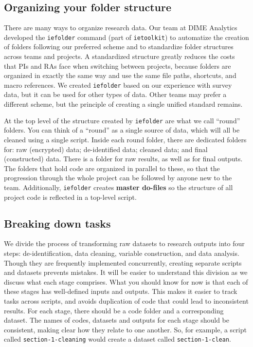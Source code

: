 \subsection{Organizing your folder structure}

There are many ways to organize research data.
Our team at DIME Analytics developed the \texttt{iefolder}
command (part of \texttt{ietoolkit})
to automatize the creation of folders following our preferred scheme and
to standardize folder structures across teams and projects.
A standardized structure greatly reduces the costs that PIs and RAs
face when switching between projects,
because folders are organized in exactly the same way
and use the same file paths, shortcuts, and macro references.
We created \texttt{iefolder} based on our experience with survey data,
but it can be used for other types of data.
Other teams may prefer a different scheme, but
the principle of creating a single unified standard remains.

At the top level of the structure created by \texttt{iefolder} are what we call ``round'' folders.
You can think of a ``round'' as a single source of data,
which will all be cleaned using a single script.
Inside each round folder, there are dedicated folders for:
raw (encrypted) data; de-identified data; cleaned data; and final (constructed) data.
There is a folder for raw results, as well as for final outputs.
The folders that hold code are organized in parallel to these,
so that the progression through the whole project can be followed by anyone new to the team.
Additionally, \texttt{iefolder} creates \textbf{master do-files}
so the structure of all project code is reflected in a top-level script.

\subsection{Breaking down tasks}

We divide the process of transforming raw datasets to research outputs into 
four steps:
de-identification, data cleaning, variable construction, and data analysis.
Though they are frequently implemented concurrently,
creating separate scripts and datasets prevents mistakes.
It will be easier to understand this division as we discuss what each stage comprises.
What you should know for now is that each of these stages has well-defined inputs and outputs.
This makes it easier to track tasks across scripts,
and avoids duplication of code that could lead to inconsistent results.
For each stage, there should be a code folder and a corresponding dataset.
The names of codes, datasets and outputs for each stage should be consistent,
making clear how they relate to one another.
So, for example, a script called \texttt{section-1-cleaning} would create
a dataset called \texttt{section-1-clean}.

